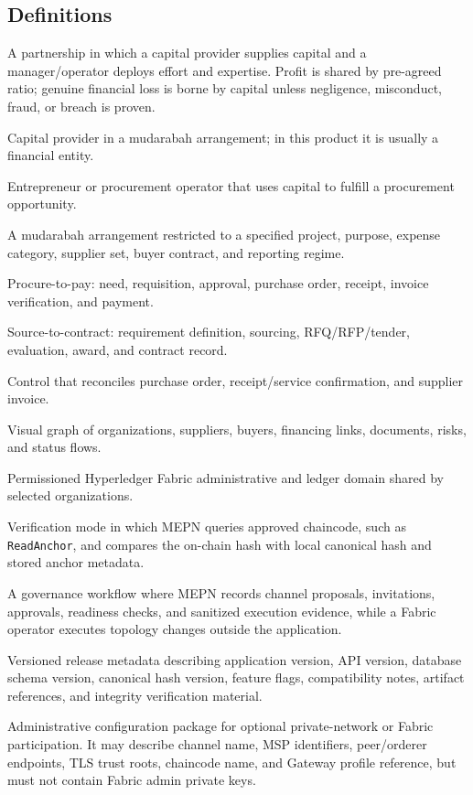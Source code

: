 \documentclass[11pt,a4paper]{article}
\newcommand{\code}[1]{\texttt{#1}}
\begin{document}
\subsection{Definitions}
\begin{description}[leftmargin=4.2cm, style=nextline]
  \item[Mudarabah] A partnership in which a capital provider supplies capital and a manager/operator deploys effort and expertise. Profit is shared by pre-agreed ratio; genuine financial loss is borne by capital unless negligence, misconduct, fraud, or breach is proven.
  \item[Rabb-ul-Mal] Capital provider in a mudarabah arrangement; in this product it is usually a financial entity.
  \item[Mudarib] Entrepreneur or procurement operator that uses capital to fulfill a procurement opportunity.
  \item[Restricted mudarabah] A mudarabah arrangement restricted to a specified project, purpose, expense category, supplier set, buyer contract, and reporting regime.
  \item[P2P] Procure-to-pay: need, requisition, approval, purchase order, receipt, invoice verification, and payment.
  \item[S2C] Source-to-contract: requirement definition, sourcing, RFQ/RFP/tender, evaluation, award, and contract record.
  \item[Three-way match] Control that reconciles purchase order, receipt/service confirmation, and supplier invoice.
  \item[Network canvas] Visual graph of organizations, suppliers, buyers, financing links, documents, risks, and status flows.
  \item[Fabric channel] Permissioned Hyperledger Fabric administrative and ledger domain shared by selected organizations.
  \item[Fabric Gateway verification] Verification mode in which MEPN queries approved chaincode, such as \code{ReadAnchor}, and compares the on-chain hash with local canonical hash and stored anchor metadata.
  \item[Operator-assisted Fabric governance] A governance workflow where MEPN records channel proposals, invitations, approvals, readiness checks, and sanitized execution evidence, while a Fabric operator executes topology changes outside the application.
  \item[Release manifest] Versioned release metadata describing application version, API version, database schema version, canonical hash version, feature flags, compatibility notes, artifact references, and integrity verification material.
  \item[Channel join package] Administrative configuration package for optional private-network or Fabric participation. It may describe channel name, MSP identifiers, peer/orderer endpoints, TLS trust roots, chaincode name, and Gateway profile reference, but must not contain Fabric admin private keys.
\end{description}
\end{document}
